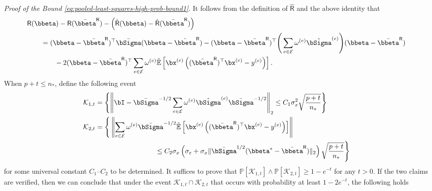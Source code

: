 \documentclass[10pt]{article}
\numberwithin{equation}{section}
\begin{document}
\noindent \emph{Proof of the Bound \eqref{eq:pooled-least-squares-high-prob-bound1}.} It follows from the definition of $\hat{\mathsf{R}}$ and the above identity that \begin{align*}
    &\mathsf{R}(\bbeta) - \mathsf{R}(\bar{\bbeta}^{\mathsf{R}}) - \left(\hat{\mathsf{R}}(\bbeta) - \hat{\mathsf{R}}(\bar{\bbeta}^{\mathsf{R}}) \right) \\
    &~~~~~~ = (\bbeta - \bar{\bbeta}^{\mathsf{R}})^\top \bar{\bSigma} (\bbeta - \bar{\bbeta}^{\mathsf{R}}) - (\bbeta - \bar{\bbeta}^{\mathsf{R}})^\top \Bigg(\sum_{e\in \mathcal{E}} \omega^{(e)}\hat{\bSigma}^{(e)}\Bigg) (\bbeta - \bar{\bbeta}^{\mathsf{R}}) \\
    &~~~~~~~~~~~~ - 2(\bbeta - \bar{\bbeta}^{\mathsf{R}})^\top \sum_{e\in \mathcal{E}} \omega^{(e)} \hat{\mathbb{E}} \left[\bx^{(e)} \left((\bar{\bbeta}^{\mathsf{R}})^\top \bx^{(e)} - y^{(e)}\right)\right].
\end{align*}
When $p + t \le n_*$, define the following event
\begin{align*}
    \mathcal{K}_{1,t} &= \left\{ \left\|\bI - \bar{\bSigma}^{-1/2} \sum_{e\in \mathcal{E}} \omega^{(e)}\hat{\bSigma}^{(e)} \bar{\bSigma}^{-1/2}\right\|_2 \le C_1 \sigma_x^2 \sqrt{\frac{p+t}{n_*}}\right\} \\
    \mathcal{K}_{2,t} &= \Bigg\{ \left\|\sum_{e\in \mathcal{E}} \omega^{(e)} \bar{\bSigma}^{-1/2} \hat{\mathbb{E}} \left[\bx^{(e)} \left((\bar{\bbeta}^{\mathsf{R}})^\top \bx^{(e)} - y^{(e)}\right)\right]\right\| \\    
    &~~~~~~~~~~~~~~~~~~~~~~~~~~\le C_2 \sigma_x \left(\sigma_\varepsilon + \sigma_x\|\bar{\bSigma}^{1/2}(\bbeta^* - \bar{\bbeta}^{\mathsf{R}})\|_2 \right) \sqrt{\frac{p+t}{n_*}}\Bigg\}
\end{align*} for some universal constant $C_1$--$C_2$ to be determined. It suffices to prove that $\mathbb{P}[\mathcal{K}_{1,t}] \land \mathbb{P}[\mathcal{K}_{2,t}] \ge 1-e^{-t}$ for any $t>0$. If the two claims are verified, then we can conclude that under the event $\mathcal{K}_{1,t} \cap \mathcal{K}_{2,t}$ that occurs with probability at least $1-2e^{-t}$, the following holds
\end{document}

